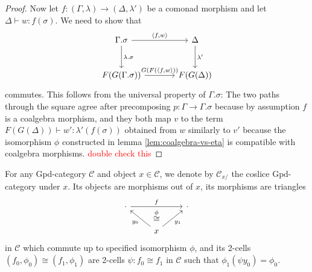 \documentclass{article}
\newcommand{\todo}[1]{\textcolor{red}{#1}}
\newtheorem{lemma}{Lemma}
\theoremstyle{remark}
\theoremstyle{definition}
\begin{document}
\begin{proof}
  Now let $f : (\Gamma, \lambda) \rightarrow (\Delta, \lambda')$ be a comonad morphism and let $\Delta \vdash w : f(\sigma)$.
  We need to show that
  \begin{equation}
    \begin{tikzcd}[column sep=large, row sep=large]
      \Gamma.\sigma \arrow[r, "{\langle f, w \rangle}"] \arrow[d, "\lambda.\sigma"] & \Delta \arrow[d, "\lambda'"] \\
      F(G(\Gamma.\sigma)) \arrow[r, "{G(F(\langle f, w \rangle}))"] & F(G(\Delta))
    \end{tikzcd}
  \end{equation}
  commutes.
  This follows from the universal property of $\Gamma.\sigma$:
  The two paths through the square agree after precomposing $p : \Gamma \rightarrow \Gamma.\sigma$ because by assumption $f$ is a coalgebra morphism, and they both map $v$ to the term $F(G(\Delta)) \vdash w' : \lambda'(f(\sigma))$ obtained from $w$ similarly to $v'$ because the isomorphism $\phi$ constructed in lemma \ref{lem:coalgebra-vs-eta} is compatible with coalgebra morphisms.
  \todo{double check this}
\end{proof}


For any $\mathrm{Gpd}$-category $\mathcal{C}$ and object $x \in \mathcal{C}$, we denote by $\mathcal{C}_{x / }$ the coslice $\mathrm{Gpd}$-category under $x$.
Its objects are morphisms out of $x$, its morphisms are triangles
\begin{equation}
  \begin{tikzcd}
    \cdot \arrow[rr, "f"] & \, & \cdot \\
    & x \arrow[ul, "y_0"] \arrow[ur, "y_1"'] \arrow[u, "\overset{\phi}{\cong}", phantom, near end]
  \end{tikzcd}
\end{equation}
in $\mathcal{C}$ which commute up to specified isomorphism $\phi$, and its 2-cells $(f_0, \phi_0) \cong (f_1, \phi_1)$ are 2-cells $\psi : f_0 \cong f_1$ in $\mathcal{C}$ such that $\phi_1 (\psi y_0) = \phi_0$.
\end{document}

